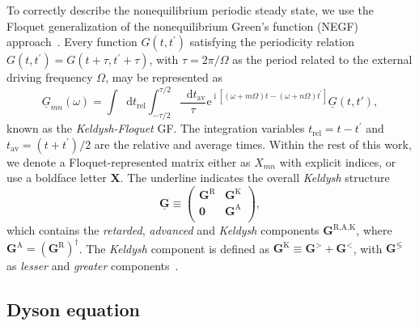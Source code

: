 \documentclass[aps,prb,groupedaddress,showpacs,twocolumn,superscriptaddress,10pt]{revtex4-2}
\newcommand{\ee}{\mathrm{e}}  %
\DeclareMathOperator*{\ii}{i} %
\newcommand*\dd{\mathop{}\!\mathrm{d}}
\newcommand{\mat}[1]{\bm{#1}} %
\newcommand{\kel}[1]{\underline{#1}} %
\begin{document}
To correctly describe the nonequilibrium periodic steady state, we use the Floquet generalization of the nonequilibrium Green's function (NEGF) approach~\cite{ts.ok.08,sc.mo.02u,jo.fr.08}. Every function $G(t,t^{\prime})$ satisfying the periodicity relation $G(t,t^{\prime})=G(t+\tau,t^{\prime}+\tau)$, with $\tau=2\pi/\Omega$ as the period related to the external driving frequency $\Omega$, may be represented as~\cite{ts.ok.08,sc.mo.02u,jo.fr.08}
% 
\begin{equation}
\label{eq:FloquetGF} 
\kel{G}_{mn}(\omega) =\int \dd t_{\text{rel}} \int_{-\tau/2}^{\tau/2} \frac{\dd t_{\text{av}}}{\tau} \ee^{\ii[\left(\omega+m\Omega\right) t -\left( \omega+n\Omega\right)t^{\prime}]} \kel{G}(t,t'),
\end{equation}
% 
known as the \emph{Keldysh-Floquet} GF. The integration variables $t_{\text{rel}} = t-t^{\prime}$ and $t_{\text{av}} = (t+t^{\prime})/2$ are the relative and average times. Within the rest of this work, we denote a Floquet-represented matrix either as $X_{mn}$ with explicit indices, or use a boldface letter $\mat{X}$. The underline indicates the overall \emph{Keldysh} structure
%
\begin{equation}\label{eq:Keld-structure}
\kel{\mat{G}} \equiv
\begin{pmatrix}
\mat{G}^{\text{R}} & \mat{G}^{\text{K}}\\
\mat{0}            & \mat{G}^{\text{A}} \\
\end{pmatrix},
\end{equation}
%
which contains the \emph{retarded}, \emph{advanced} and \emph{Keldysh} components $\mat{G}^{\text{R,A,K}}$, where $\mat{G}^{\text{A}}=(\mat{G}^{\text{R}})^{\dagger}$. The \emph{Keldysh} component is defined as $\mat{G}^{\text{K}} \equiv \mat{G}^{>} + \mat{G}^{<}$, with $\mat{G}^{\lessgtr}$ as \emph{lesser} and \emph{greater} components~\cite{schw.61,keld.65,ra.sm.86,ha.ja}.
  
\subsection{Dyson equation} 
\label{sec:Dyson_equation}
\end{document}
